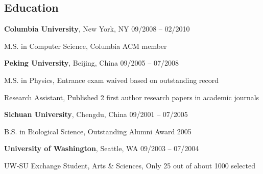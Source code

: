 \documentclass[margin,line]{resume}
\begin{document}
\begin{resume}
    \section{\mysidestyle Education}

    \textbf{Columbia University}, New York, NY \hfill 09/2008 -- 02/2010 \vspace{-3mm}\\\vspace{-1mm}%
      \begin{list2}
       \item M.S. in Computer Science, Columbia ACM member
      \end{list2}
 

    \textbf{Peking University}, Beijing, China \hfill 09/2005 -- 07/2008 \vspace{-3mm}\\\vspace{-1mm}%
      \begin{list2}
       \item M.S. in Physics, Entrance exam waived based on outstanding record
       \item Research Assistant, Published 2 first author research papers in academic journals
      \end{list2}
    
    \textbf{Sichuan University}, Chengdu, China \hfill 09/2001 -- 07/2005 \vspace{-3mm}\\\vspace{-1mm}%
      \begin{list2}
       \item B.S. in Biological Science, Outstanding Alumni Award 2005
      \end{list2}

    \textbf{University of Washington}, Seattle, WA \hfill 09/2003 -- 07/2004 \vspace{-3mm}\\\vspace{-1mm}%
      \begin{list2}
       \item  UW-SU Exchange Student, Arts \& Sciences, Only 25 out of about 1000 selected
      \end{list2}



\end{resume}
\end{document}
